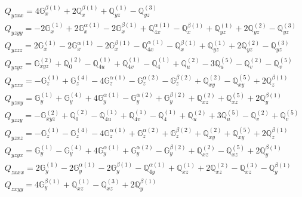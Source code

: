 \documentclass[fleqn,8pt,landscape]{jsarticle}
\begin{document}
\begin{align*}
& Q_{yzxx} = 4 \mathbb{G}_{x}^{\beta(1)} + 2 \mathbb{Q}_{x}^{\beta(1)} + \mathbb{Q}_{yz}^{(1)} - \mathbb{Q}_{yz}^{(3)} \\
& Q_{yzyy} = - 2 \mathbb{G}_{x}^{(1)} + 2 \mathbb{G}_{x}^{\alpha(1)} - 2 \mathbb{G}_{x}^{\beta(1)} + \mathbb{Q}_{4x}^{\alpha(1)} - \mathbb{Q}_{x}^{\beta(1)} + \mathbb{Q}_{yz}^{(1)} + 2 \mathbb{Q}_{yz}^{(2)} - \mathbb{Q}_{yz}^{(3)} \\
& Q_{yzzz} = 2 \mathbb{G}_{x}^{(1)} - 2 \mathbb{G}_{x}^{\alpha(1)} - 2 \mathbb{G}_{x}^{\beta(1)} - \mathbb{Q}_{4x}^{\alpha(1)} - \mathbb{Q}_{x}^{\beta(1)} + \mathbb{Q}_{yz}^{(1)} + 2 \mathbb{Q}_{yz}^{(2)} - \mathbb{Q}_{yz}^{(3)} \\
& Q_{yzyz} = \mathbb{G}_{xyz}^{(2)} + \mathbb{Q}_{0}^{(2)} - \mathbb{Q}_{4u}^{(1)} + \mathbb{Q}_{4v}^{(1)} - \mathbb{Q}_{4}^{(1)} + \mathbb{Q}_{u}^{(2)} - 3 \mathbb{Q}_{u}^{(5)} - \mathbb{Q}_{v}^{(2)} - \mathbb{Q}_{v}^{(5)} \\
& Q_{yzzx} = - \mathbb{G}_{z}^{(1)} + \mathbb{G}_{z}^{(4)} - 4 \mathbb{G}_{z}^{\alpha(1)} - \mathbb{G}_{z}^{\alpha(2)} - \mathbb{G}_{z}^{\beta(2)} + \mathbb{Q}_{xy}^{(2)} - \mathbb{Q}_{xy}^{(5)} + 2 \mathbb{Q}_{z}^{\beta(1)} \\
& Q_{yzxy} = \mathbb{G}_{y}^{(1)} + \mathbb{G}_{y}^{(4)} + 4 \mathbb{G}_{y}^{\alpha(1)} - \mathbb{G}_{y}^{\alpha(2)} + \mathbb{G}_{y}^{\beta(2)} + \mathbb{Q}_{xz}^{(2)} + \mathbb{Q}_{xz}^{(5)} + 2 \mathbb{Q}_{y}^{\beta(1)} \\
& Q_{yzzy} = - \mathbb{G}_{xyz}^{(2)} + \mathbb{Q}_{0}^{(2)} - \mathbb{Q}_{4u}^{(1)} + \mathbb{Q}_{4v}^{(1)} - \mathbb{Q}_{4}^{(1)} + \mathbb{Q}_{u}^{(2)} + 3 \mathbb{Q}_{u}^{(5)} - \mathbb{Q}_{v}^{(2)} + \mathbb{Q}_{v}^{(5)} \\
& Q_{yzxz} = - \mathbb{G}_{z}^{(1)} - \mathbb{G}_{z}^{(4)} - 4 \mathbb{G}_{z}^{\alpha(1)} + \mathbb{G}_{z}^{\alpha(2)} + \mathbb{G}_{z}^{\beta(2)} + \mathbb{Q}_{xy}^{(2)} + \mathbb{Q}_{xy}^{(5)} + 2 \mathbb{Q}_{z}^{\beta(1)} \\
& Q_{yzyx} = \mathbb{G}_{y}^{(1)} - \mathbb{G}_{y}^{(4)} + 4 \mathbb{G}_{y}^{\alpha(1)} + \mathbb{G}_{y}^{\alpha(2)} - \mathbb{G}_{y}^{\beta(2)} + \mathbb{Q}_{xz}^{(2)} - \mathbb{Q}_{xz}^{(5)} + 2 \mathbb{Q}_{y}^{\beta(1)} \\
& Q_{zxxx} = 2 \mathbb{G}_{y}^{(1)} - 2 \mathbb{G}_{y}^{\alpha(1)} - 2 \mathbb{G}_{y}^{\beta(1)} - \mathbb{Q}_{4y}^{\alpha(1)} + \mathbb{Q}_{xz}^{(1)} + 2 \mathbb{Q}_{xz}^{(2)} - \mathbb{Q}_{xz}^{(3)} - \mathbb{Q}_{y}^{\beta(1)} \\
& Q_{zxyy} = 4 \mathbb{G}_{y}^{\beta(1)} + \mathbb{Q}_{xz}^{(1)} - \mathbb{Q}_{xz}^{(3)} + 2 \mathbb{Q}_{y}^{\beta(1)} \\

\end{align*}
\end{document}
